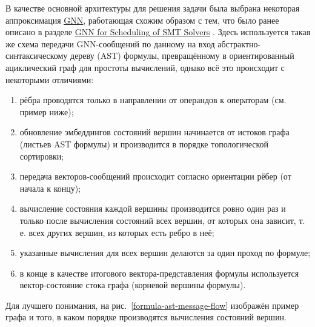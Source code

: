 В качестве основной архитектуры для решения задачи была выбрана некоторая аппроксимация \underline{\hyperref[gnn-architecture]{GNN}}, работающая схожим образом с тем, что было ранее описано в разделе \underline{\hyperref[gnn-for-scheduling-of-smt-solvers]{GNN for Scheduling of SMT Solvers}} \cite{gnn-for-scheduling-paper}. Здесь используется такая же схема передачи GNN-сообщений по данному на вход абстрактно-синтаксическому дереву (AST) формулы, превращённому в ориентированный ациклический граф для простоты вычислений, однако всё это происходит с некоторыми отличиями:

\begin{enumerate}
    \item рёбра проводятся только в направлении от операндов к операторам (см. пример ниже);
    \item обновление эмбеддингов состояний вершин начинается от истоков графа (листьев AST формулы) и производится в порядке топологической сортировки;
    \item передача векторов-сообщений происходит согласно ориентации рёбер (от начала к концу);
    \item вычисление состояния каждой вершины производится ровно один раз и только после вычисления состояний всех вершин, от которых она зависит, т. е. всех других вершин, из которых есть ребро в неё;
    \item указанные вычисления для всех вершин делаются за один проход по формуле;
    \item в конце в качестве итогового вектора-представления формулы используется вектор-состояние стока графа (корневой вершины формулы).
\end{enumerate}

Для лучшего понимания, на рис.~\ref{formula-ast-message-flow} изображён пример графа и того, в каком порядке производятся вычисления состояний вершин.

